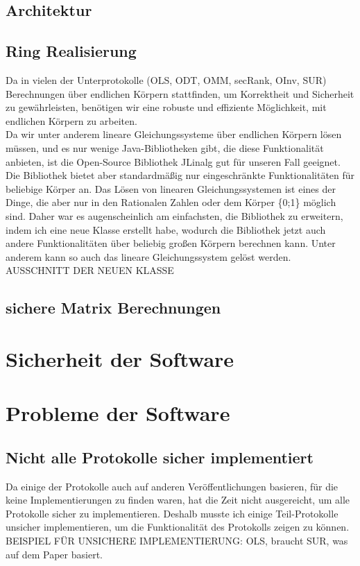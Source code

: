 \documentclass[a4paper,10pt]{scrartcl}
\begin{document}
\subsection{Architektur}
\subsection{Ring Realisierung}
Da in vielen der Unterprotokolle (OLS, ODT, OMM, secRank, OInv, SUR) Berechnungen über endlichen Körpern stattfinden, um Korrektheit und Sicherheit zu gewährleisten, benötigen wir eine robuste und effiziente Möglichkeit, mit endlichen Körpern zu arbeiten.\\
Da wir unter anderem lineare Gleichungssysteme über endlichen Körpern lösen müssen, und es nur wenige Java-Bibliotheken gibt, die diese Funktionalität anbieten, ist die Open-Source Bibliothek JLinalg \cite{JLinAlg} gut für unseren Fall geeignet. Die Bibliothek bietet aber standardmäßig nur eingeschränkte Funktionalitäten für beliebige Körper an. Das Lösen von linearen Gleichungssystemen ist eines der Dinge, die aber nur in den  Rationalen Zahlen oder dem Körper \{0;1\} möglich sind. Daher war es augenscheinlich am einfachsten, die Bibliothek zu erweitern, indem ich eine neue Klasse erstellt habe, wodurch die Bibliothek jetzt auch andere Funktionalitäten über beliebig großen Körpern berechnen kann. Unter anderem kann so auch das lineare Gleichungssystem gelöst werden.\\

AUSSCHNITT DER NEUEN KLASSE



\subsection{sichere Matrix Berechnungen}

\section{Sicherheit der Software}

\section{Probleme der Software}
\subsection{Nicht alle Protokolle sicher implementiert}
Da einige der Protokolle auch auf anderen Veröffentlichungen basieren, für die keine Implementierungen zu finden waren, hat die Zeit nicht ausgereicht, um alle Protokolle sicher zu implementieren. Deshalb musste ich einige Teil-Protokolle unsicher implementieren, um die Funktionalität des Protokolls zeigen zu können.\\
BEISPIEL  FÜR UNSICHERE IMPLEMENTIERUNG:
OLS, braucht SUR, was auf dem Paper \cite{tcc-2007-3673} basiert.
\end{document}
